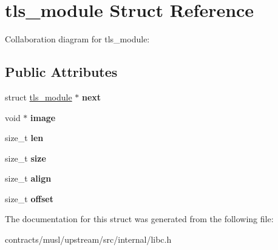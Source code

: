 \hypertarget{structtls__module}{}\section{tls\+\_\+module Struct Reference}
\label{structtls__module}


Collaboration diagram for tls\+\_\+module\+:
\subsection*{Public Attributes}
\begin{DoxyCompactItemize}
\item 
\mbox{\label{structtls__module_abe56cd7bcd8012df52367ca99aa451c7}} 
struct \mbox{\hyperlink{structtls__module}{tls\+\_\+module}} $\ast$ {\bfseries next}
\item 
\mbox{\label{structtls__module_a19256e59b1cb3290a79507899aefd9e3}} 
void $\ast$ {\bfseries image}
\item 
\mbox{\label{structtls__module_a7d7d16c89b5533ac218e1b4f83326a0a}} 
size\+\_\+t {\bfseries len}
\item 
\mbox{\label{structtls__module_aff3f2b4688d347781e7c1b84c8189828}} 
size\+\_\+t {\bfseries size}
\item 
\mbox{\label{structtls__module_aef561a3c36a343d7011a305bc7bab99f}} 
size\+\_\+t {\bfseries align}
\item 
\mbox{\label{structtls__module_a63bf03e2de008017d80b006ac2525de2}} 
size\+\_\+t {\bfseries offset}
\end{DoxyCompactItemize}


The documentation for this struct was generated from the following file\+:\begin{DoxyCompactItemize}
\item 
contracts/musl/upstream/src/internal/libc.\+h\end{DoxyCompactItemize}
